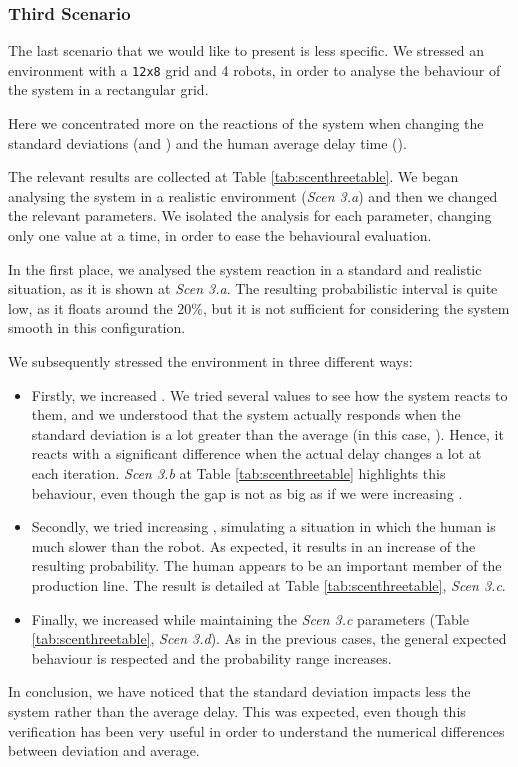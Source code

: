 \subsubsection{Third Scenario}
The last scenario that we would like to present is less specific. We stressed an environment with a \texttt{12x8} grid and 4 robots, in order to analyse the behaviour of the system in a rectangular grid. 

Here we concentrated more on the reactions of the system when changing the standard deviations (\vH \space and \vT) and the human average delay time (\mH).

The relevant results are collected at Table \ref{tab:scenthreetable}. We began analysing the system in a realistic environment (\emph{Scen 3.a}) and then we changed the relevant parameters. We isolated the analysis for each parameter, changing only one value at a time, in order to ease the behavioural evaluation.

In the first place, we analysed the system reaction in a standard and realistic situation, as it is shown at \emph{Scen 3.a}. The resulting probabilistic interval is quite low, as it floats around the $20\%$, but it is not sufficient for considering the system smooth in this configuration.

We subsequently stressed the environment in three different ways:
\begin{itemize}
    \item Firstly, we increased \vT. We tried several values to see how the system reacts to them, and we understood that the system actually responds when the standard deviation is a lot greater than the average (in this case, \mT). Hence, it reacts with a significant difference when the actual delay changes a lot at each iteration. \emph{Scen 3.b} at Table \ref{tab:scenthreetable} highlights this behaviour, even though the gap is not as big as if we were increasing \mT.
    \item Secondly, we tried increasing \mH, simulating a situation in which the human is much slower than the robot. As expected, it results in an increase of the resulting probability. The human appears to be an important member of the production line. The result is detailed at Table \ref{tab:scenthreetable}, \emph{Scen 3.c}.
    \item Finally, we increased \vH while maintaining the \emph{Scen 3.c} parameters (Table \ref{tab:scenthreetable}, \emph{Scen 3.d}). As in the previous cases, the general expected behaviour is respected and the probability range increases.
\end{itemize}

In conclusion, we have noticed that the standard deviation impacts less the system rather than the average delay. This was expected, even though this verification has been very useful in order to understand the numerical differences between deviation and average.
